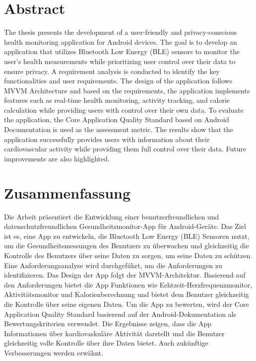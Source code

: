 \documentclass[oneside,bibliography=totocnumbered,BCOR=5mm]{scrbook}%
\begin{document}
\newpage
\thispagestyle{empty}       

\section*{Abstract}
The thesis presents the development of a user-friendly and privacy-conscious health monitoring application for Android devices. 
The goal is to develop an application that utilizes Bluetooth Low Energy (BLE) sensors to monitor the user's health measurements while prioritizing user control over their data to ensure privacy.
A requirement analysis is conducted to identify the key functionalities and user requirements.
The design of the application follows MVVM Architecture and based on the requirements, the application implements features such as real-time health monitoring, activity tracking, and calorie calculation while providing users with control over their own data.
To evaluate the application, the Core Application Quality Standard based on Android Documentation is used as the assessment metric.
The results show that the application successfully provides users with information about their cardiovascular activity while providing them full control over their data. 
Future improvements are also highlighted.
\newpage

\thispagestyle{empty}      
\section*{Zusammenfassung}
Die Arbeit  pr\"asentiert die Entwicklung einer benutzerfreundlichen und datenschutzfreundlichen Gesundheitsmonitor-App f\"ur Android-Ger\"ate.
Das Ziel ist es, eine App zu entwickeln, die Bluetooth Low Energy (BLE) Sensoren nutzt, um die Gesundheitsmessungen des Benutzers zu \"uberwachen und gleichzeitig die Kontrolle des Benutzers \"uber seine Daten zu sorgen, um seine Daten zu sch\"utzen.
Eine Anforderungsanalyse wird durchgef\"uhrt, um die Anforderungen zu identifizieren.
Das Design der App folgt der MVVM-Architektur.
Basierend auf den Anforderungen bietet die App Funktionen wie Echtzeit-Herzfrequenzmonitor, Aktivit\"atsmonitor und Kalorienberechnung und bietet dem Benutzer gleichzeitig die Kontrolle \"uber seine eigenen Daten.
Um die App zu bewerten, wird der Core Application Quality Standard basierend auf der Android-Dokumentation als Bewertungskriterien verwendet.
Die Ergebnisse zeigen, dass die App Informationen \"uber kardiovaskul\"are Aktivit\"at darstellt und die Benutzer gleichzeitig volle Kontrolle \"uber ihre Daten bietet.
Auch zuk\"unftige Verbesserungen werden erw\"ahnt.
\end{document}
